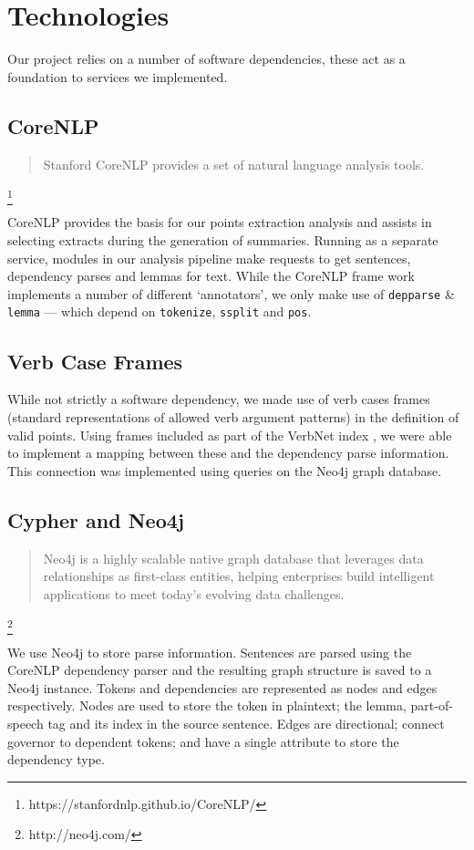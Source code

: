 \chapter{Technologies\label{chap:technologies}}
  Our project relies on a number of software dependencies, these act as a foundation to services we implemented.

  \tocless\section{CoreNLP}
    \blockquote{Stanford CoreNLP provides a set of natural language analysis tools.}\footnote{https://stanfordnlp.github.io/CoreNLP/}

    CoreNLP provides the basis for our points extraction analysis and assists in selecting extracts during the generation of summaries. Running as a separate service, modules in our analysis pipeline make requests to get sentences, dependency parses and lemmas for text. While the CoreNLP frame work implements a number of different `annotators', we only make use of \texttt{depparse} \& \texttt{lemma} --- which depend on \texttt{tokenize}, \texttt{ssplit} and \texttt{pos}.

  \tocless\section{Verb Case Frames}
    While not strictly a software dependency, we made use of verb cases frames (standard representations of allowed verb argument patterns) in the definition of valid points. Using frames included as part of the VerbNet index \cite{schuler2005verbnet, fillmore2002framenet}, we were able to implement a mapping between these and the dependency parse information. This connection was implemented using queries on the Neo4j graph database.

  \tocless\section{Cypher and Neo4j}
    \blockquote{Neo4j is a highly scalable native graph database that leverages data relationships as first-class entities, helping enterprises build intelligent applications to meet today's evolving data challenges.}\footnote{http://neo4j.com/}

    We use Neo4j to store parse information. Sentences are parsed using the CoreNLP dependency parser and the resulting graph structure is saved to a Neo4j instance. Tokens and dependencies are represented as nodes and edges respectively. Nodes are used to store the token in plaintext; the lemma, part-of-speech tag and its index in the source sentence. Edges are directional; connect governor to dependent tokens; and have a single attribute to store the dependency type.

